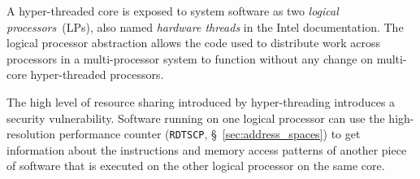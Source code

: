 A hyper-threaded core is exposed to system software as two \textit{logical
processors}~(LPs), also named \textit{hardware threads} in the Intel
documentation. The logical processor abstraction allows the code used to
distribute work across processors in a multi-processor system to function
without any change on multi-core hyper-threaded processors.

The high level of resource sharing introduced by hyper-threading introduces a
security vulnerability. Software running on one logical processor can use the
high-resolution performance counter (\texttt{RDTSCP},
\S~\ref{sec:address_spaces}) \cite{petters1999making} to get information about
the instructions and memory access patterns of another piece of software that
is executed on the other logical processor on the same core.
